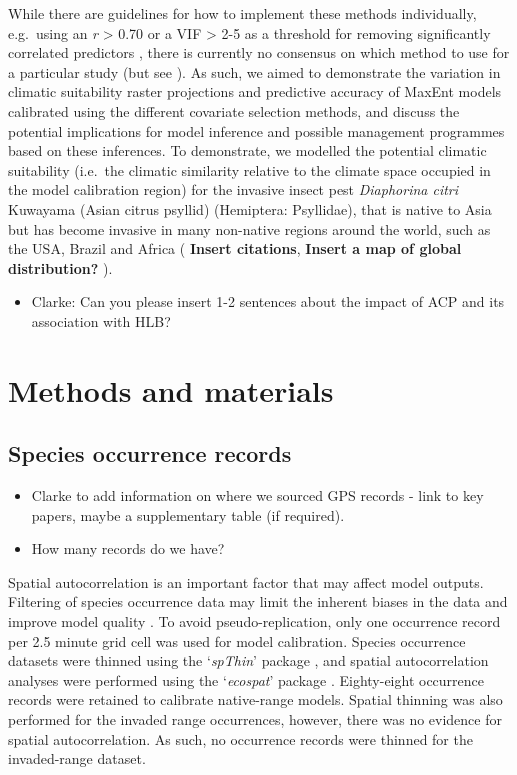 \documentclass[
  authoryear,
  preprint,
  3p,
  onecolumn]{elsarticle}
\providecommand{\tightlist}{%
  \setlength{\itemsep}{0pt}\setlength{\parskip}{0pt}}\usepackage{longtable,booktabs,array}
\begin{document}
While there are guidelines for how to implement these methods
individually, e.g.~using an \textbar{}\emph{r}\textbar{} \textgreater{}
0.70 or a VIF \textgreater{} 2-5 as a threshold for removing
significantly correlated predictors \citep{Dormann2013}, there is
currently no consensus on which method to use for a particular study
(but see \citet{Adde2023}). As such, we aimed to demonstrate the
variation in climatic suitability raster projections and predictive
accuracy of MaxEnt models calibrated using the different covariate
selection methods, and discuss the potential implications for model
inference and possible management programmes based on these inferences.
To demonstrate, we modelled the potential climatic suitability (i.e.~the
climatic similarity relative to the climate space occupied in the model
calibration region) for the invasive insect pest \emph{Diaphorina citri}
Kuwayama (Asian citrus psyllid) (Hemiptera: Psyllidae), that is native
to Asia but has become invasive in many non-native regions around the
world, such as the USA, Brazil and Africa ( \textbf{Insert citations},
\textbf{Insert a map of global distribution?} ).

\begin{itemize}
\tightlist
\item
  Clarke: Can you please insert 1-2 sentences about the impact of ACP
  and its association with HLB?
\end{itemize}

\hypertarget{methods-and-materials}{%
\section{Methods and materials}\label{methods-and-materials}}

\hypertarget{species-occurrence-records}{%
\subsection{Species occurrence
records}\label{species-occurrence-records}}

\begin{itemize}
\tightlist
\item
  Clarke to add information on where we sourced GPS records - link to
  key papers, maybe a supplementary table (if required).
\item
  How many records do we have?
\end{itemize}

Spatial autocorrelation is an important factor that may affect model
outputs. Filtering of species occurrence data may limit the inherent
biases in the data and improve model quality \citep{Veloz2009}. To avoid
pseudo-replication, only one occurrence record per 2.5 minute grid cell
was used for model calibration. Species occurrence datasets were thinned
using the `\emph{spThin}' package \citep{Aiello-Lammens2015}, and
spatial autocorrelation analyses were performed using the
`\emph{ecospat}' package \citep{DiCola2017}. Eighty-eight occurrence
records were retained to calibrate native-range models. Spatial thinning
was also performed for the invaded range occurrences, however, there was
no evidence for spatial autocorrelation. As such, no occurrence records
were thinned for the invaded-range dataset.
\end{document}
